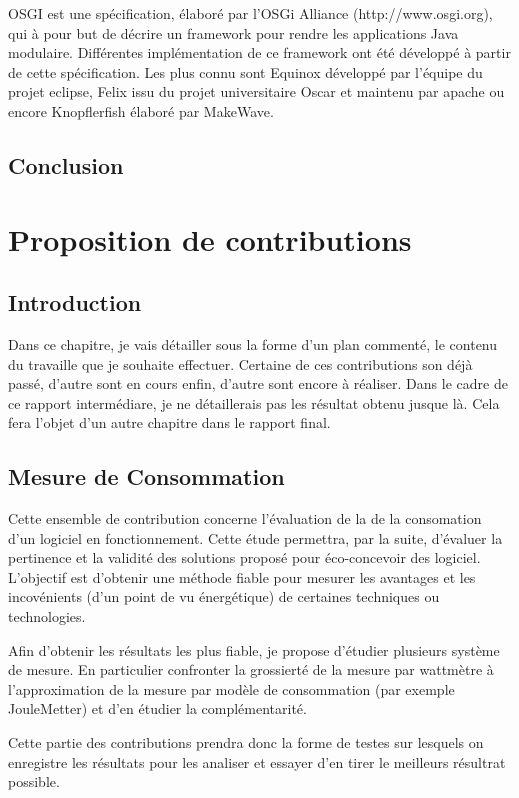 \documentclass[a4paper, 11pt]{report}
\begin{document}
OSGI est une spécification, élaboré par l’OSGi Alliance (http://www.osgi.org), qui à pour but de décrire un framework pour rendre les applications Java modulaire. Différentes implémentation de ce framework ont été développé à partir de cette spécification. Les plus connu sont Equinox développé par l’équipe du projet eclipse, Felix issu du projet universitaire Oscar et maintenu par apache ou encore Knopflerfish élaboré par MakeWave.
\section{Conclusion}

\chapter{Proposition de contributions}
\section{Introduction}
Dans ce chapitre, je vais détailler sous la forme d'un plan commenté, le contenu du travaille que je souhaite effectuer. Certaine de ces contributions son déjà passé, d'autre sont en cours enfin, d'autre sont encore à réaliser. Dans le cadre de ce rapport intermédiare, je ne détaillerais pas les résultat obtenu jusque là. Cela fera l'objet d'un autre chapitre dans le rapport final.

\section{Mesure de Consommation}
Cette ensemble de contribution concerne l'évaluation de la de la consomation d'un logiciel en fonctionnement. Cette étude permettra, par la suite, d'évaluer la pertinence et la validité des solutions proposé pour éco-concevoir des logiciel. L'objectif est d'obtenir une méthode fiable pour mesurer les avantages et les incovénients (d'un point de vu énergétique) de certaines techniques ou technologies.

Afin d'obtenir les résultats les plus fiable, je propose d'étudier plusieurs système de mesure. En particulier confronter la grossierté de la mesure par wattmètre à l'approximation de la mesure par modèle de consommation (par exemple JouleMetter) et d'en étudier la complémentarité.

Cette partie des contributions prendra donc la forme de testes sur lesquels on enregistre les résultats pour les analiser et essayer d'en tirer le meilleurs résultrat possible.
\end{document}
